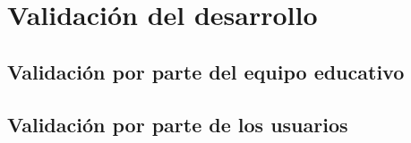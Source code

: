 
\chapter{Validación del desarrollo} %

\label{capitulo7} %




\section{Validación por parte del equipo educativo}

\section{Validación por parte de los usuarios}
